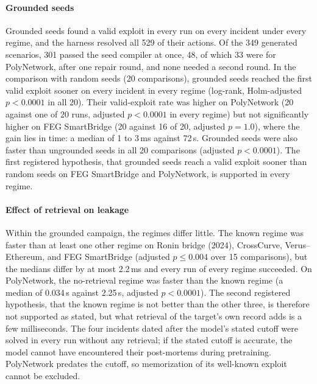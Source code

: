 \documentclass[a4paper]{cas-sc}
\begin{document}
\paragraph{Grounded seeds}
Grounded seeds found a valid exploit in every run on every incident under every regime, and the harness resolved all 529 of their actions. Of the 349 generated scenarios, 301 passed the seed compiler at once, 48, of which 33 were for PolyNetwork, after one repair round, and none needed a second round. In the comparison with random seeds (20 comparisons), grounded seeds reached the first valid exploit sooner on every incident in every regime (log-rank, Holm-adjusted $p<0.0001$ in all 20). Their valid-exploit rate was higher on PolyNetwork (20 against one of 20 runs, adjusted $p<0.0001$ in every regime) but not significantly higher on FEG SmartBridge (20 against 16 of 20, adjusted $p=1.0$), where the gain lies in time: a median of 1 to 3\,ms against 72\,s. Grounded seeds were also faster than ungrounded seeds in all 20 comparisons (adjusted $p<0.0001$). The first registered hypothesis, that grounded seeds reach a valid exploit sooner than random seeds on FEG SmartBridge and PolyNetwork, is supported in every regime.

\paragraph{Effect of retrieval on leakage}
Within the grounded campaign, the regimes differ little. The known regime was faster than at least one other regime on Ronin bridge (2024), CrossCurve, Verus--Ethereum, and FEG SmartBridge (adjusted $p \le 0.004$ over 15 comparisons), but the medians differ by at most 2.2\,ms and every run of every regime succeeded. On PolyNetwork, the no-retrieval regime was faster than the known regime (a median of 0.034\,s against 2.25\,s, adjusted $p<0.0001$). The second registered hypothesis, that the known regime is not better than the other three, is therefore not supported as stated, but what retrieval of the target's own record adds is a few milliseconds. The four incidents dated after the model's stated cutoff were solved in every run without any retrieval; if the stated cutoff is accurate, the model cannot have encountered their post-mortems during pretraining. PolyNetwork predates the cutoff, so memorization of its well-known exploit cannot be excluded.
\end{document}
